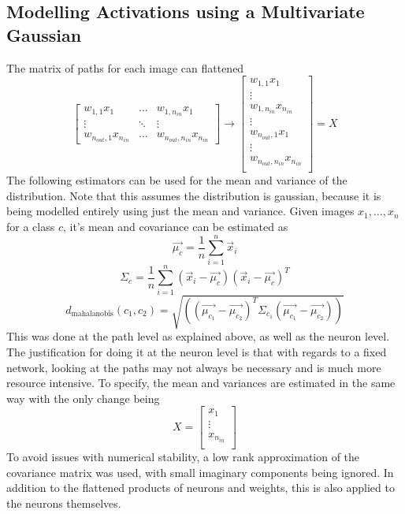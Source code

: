 \documentclass{article}
\begin{document}
        \subsection{Modelling Activations using a Multivariate Gaussian}
            The matrix of paths for each image can flattened
            \[\begin{bmatrix}
                w_{1,1}x_1  & \dots & w_{1,n_{in}}x_1 \\
                \vdots & \ddots & \vdots \\
                w_{n_{out}, 1}x_{n_{in}} & \dots & w_{n_{out}, n_{in}}x_{n_{in}} 
            \end{bmatrix} 
            \rightarrow 
            \begin{bmatrix}
                w_{1,1}x_1 \\
                \vdots \\
                w_{1,n_{in}}x_{n_{in}} \\
                \vdots \\
                w_{n_{out},1}x_{1} \\
                \vdots \\
                w_{n_{out}, n_{in}}x_{n_{in}} \\
            \end{bmatrix} = X
            \]
            The following estimators can be used for the mean and variance of the distribution. Note that this assumes the distribution is gaussian, because it is being modelled entirely using just the mean and variance. Given images $x_1, \dots, x_n$ for a class $c$, it's mean and covariance can be estimated as
            \[\vec{\mu_c} = \frac{1}{n}\sum_{i=1}^n \vec{x}_i\]
            \[\Sigma_c = \frac{1}{n}\sum_{i=1}^n (\vec{x}_i - \vec{\mu_c})(\vec{x}_i - \vec{\mu_c})^T\]
            \[d_{\text{mahalanobis}}(c_1, c_2) = \sqrt{((\vec{\mu_{c_1}} - \vec{\mu_{c_2}})^T\Sigma_{c_1}(\vec{\mu_{c_1}} -\vec{\mu_{c_2}}))}\]
            This was done at the path level as explained above, as well as the neuron level. The justification for doing it at the neuron level is that with regards to a fixed network, looking at the paths may not always be necessary and is much more resource intensive. To specify, the mean and variances are estimated in the same way with the only change being
            \[X = 
            \begin{bmatrix}
                x_1 \\
                \vdots \\
                x_{n_{in}} \\
            \end{bmatrix}
            \]
            To avoid issues with numerical stability, a low rank approximation of the covariance matrix was used, with small imaginary components being ignored. In addition to the flattened products of neurons and weights, this is also applied to the neurons themselves. 
        
\end{document}
